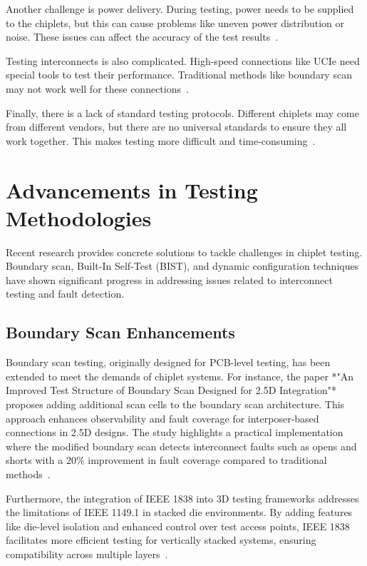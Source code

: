 \documentclass[acmtog, 12pt]{acmart}
\begin{document}
Another challenge is power delivery. During testing, power needs to be supplied to the chiplets, but this can cause problems like uneven power distribution or noise. These issues can affect the accuracy of the test results~\cite{9107636}.

Testing interconnects is also complicated. High-speed connections like UCIe need special tools to test their performance. Traditional methods like boundary scan may not work well for these connections~\cite{10766679}.

Finally, there is a lack of standard testing protocols. Different chiplets may come from different vendors, but there are no universal standards to ensure they all work together. This makes testing more difficult and time-consuming~\cite{9107636}.


\section*{Advancements in Testing Methodologies}

Recent research provides concrete solutions to tackle challenges in chiplet testing. Boundary scan, Built-In Self-Test (BIST), and dynamic configuration techniques have shown significant progress in addressing issues related to interconnect testing and fault detection.

\subsection*{Boundary Scan Enhancements}
Boundary scan testing, originally designed for PCB-level testing, has been extended to meet the demands of chiplet systems. For instance, the paper *"An Improved Test Structure of Boundary Scan Designed for 2.5D Integration"* proposes adding additional scan cells to the boundary scan architecture. This approach enhances observability and fault coverage for interposer-based connections in 2.5D designs. The study highlights a practical implementation where the modified boundary scan detects interconnect faults such as opens and shorts with a 20\% improvement in fault coverage compared to traditional methods~\cite{10365967}.

Furthermore, the integration of IEEE 1838 into 3D testing frameworks addresses the limitations of IEEE 1149.1 in stacked die environments. By adding features like die-level isolation and enhanced control over test access points, IEEE 1838 facilitates more efficient testing for vertically stacked systems, ensuring compatibility across multiple layers~\cite{6515989}.
\end{document}
